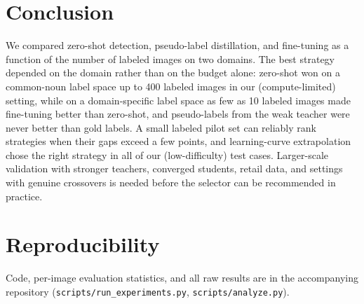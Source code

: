 \documentclass[conference]{IEEEtran}
\begin{document}
\section{Conclusion}
We compared zero-shot detection, pseudo-label distillation, and fine-tuning as a function of the number of labeled images on two domains. The best strategy depended on the domain rather than on the budget alone: zero-shot won on a common-noun label space up to 400 labeled images in our (compute-limited) setting, while on a domain-specific label space as few as 10 labeled images made fine-tuning better than zero-shot, and pseudo-labels from the weak teacher were never better than gold labels. A small labeled pilot set can reliably rank strategies when their gaps exceed a few points, and learning-curve extrapolation chose the right strategy in all of our (low-difficulty) test cases. Larger-scale validation with stronger teachers, converged students, retail data, and settings with genuine crossovers is needed before the selector can be recommended in practice.

\section*{Reproducibility}
Code, per-image evaluation statistics, and all raw results are in the accompanying repository (\texttt{scripts/run\_experiments.py}, \texttt{scripts/analyze.py}).



\end{document}
